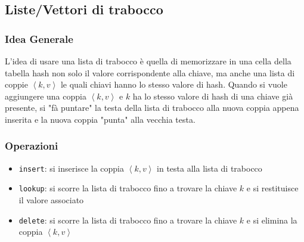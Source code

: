     \subsection{Liste/Vettori di trabocco}
        \subsubsection{Idea Generale}
            L'idea di usare una lista di trabocco è quella di memorizzare in una cella della tabella hash non solo il valore corrispondente alla chiave, ma anche una lista di coppie $\left< k, v \right>$ le quali chiavi hanno lo stesso valore di hash.\newline
            Quando si vuole aggiungere una coppia $\left< k, v \right>$ e $k$ ha lo stesso valore di hash di una chiave già presente, si "fà puntare" la testa della lista di trabocco alla nuova coppia appena inserita e la nuova coppia "punta" alla vecchia testa.
        \subsubsection{Operazioni}
            \begin{itemize}
                \item \texttt{insert}: si inserisce la coppia $\left< k, v \right>$ in testa alla lista di trabocco
                \item \texttt{lookup}: si scorre la lista di trabocco fino a trovare la chiave $k$ e si restituisce il valore associato
                \item \texttt{delete}: si scorre la lista di trabocco fino a trovare la chiave $k$ e si elimina la coppia $\left< k, v \right>$
            \end{itemize}
